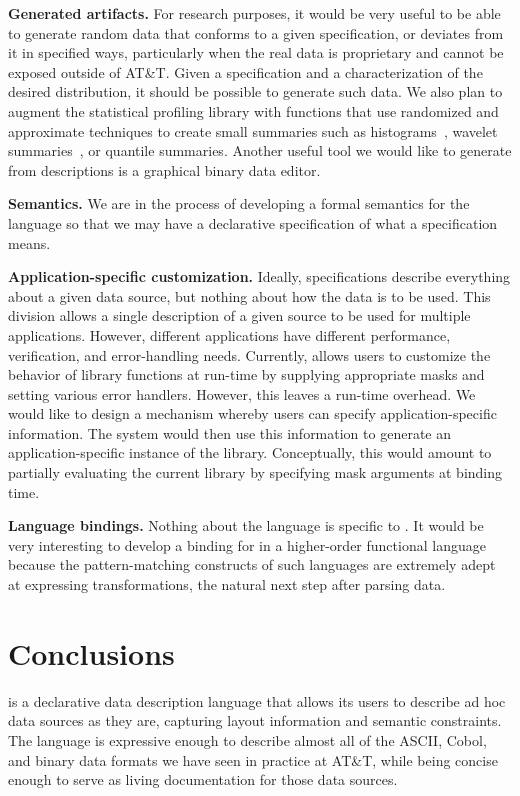 \documentclass{sig-alternate}
\begin{document}
\textbf{Generated artifacts.} 
For research purposes, it would be very useful to be able to generate random data that conforms to a given specification, or 
deviates from it in specified ways, particularly when the real data is proprietary and cannot be exposed outside of AT\&T. 
Given a \pads{} specification and a characterization of the desired distribution, it should be possible to generate such data.  We also plan to augment the statistical profiling library with
functions that use randomized and approximate techniques to create
small summaries such as histograms~\cite{histograms,histograms-wavelets}, wavelet summaries~\cite{histograms-wavelets},
or quantile summaries\cite{quantiles}.
Another useful tool we 
would like to generate from \pads{} descriptions is a graphical binary data editor. 

\textbf{Semantics.}  We are in the process of developing a formal semantics for the \pads{} language so that we may have a declarative specification of what a \pads{} specification means.

\textbf{Application-specific customization.}
Ideally, \pads{} specifications describe everything about a given
data source, but nothing about how the data is to be used. This
division allows a single description of a given source to be used
for multiple applications.  However, different applications have different
performance, verification, and error-handling needs.  Currently,
\pads{} allows users to customize the behavior of library
functions at run-time by supplying appropriate masks and setting various error handlers.  However, this leaves a run-time overhead.  We would like to 
design a mechanism whereby users can specify application-specific information.  The \pads{} system would then use this information to generate an 
application-specific instance of the library.  Conceptually, this would
amount to partially evaluating the current \pads{} library by specifying mask arguments at binding time.

\textbf{Language bindings.}  Nothing about the \pads{} language is specific to \C{}.  It would be very interesting to develop a binding for \pads{} in a higher-order functional language because the pattern-matching constructs of such languages are extremely adept at expressing transformations, the natural next step after parsing data.


\section{Conclusions}
\pads{} is a declarative data description language that allows 
its users to describe ad hoc data sources as they are, capturing
layout information and semantic constraints.  The language
is expressive enough to describe almost all of the ASCII, Cobol, 
and binary data formats we have seen in practice at AT\&T, while being 
concise enough to serve as living documentation for those data sources.  
\end{document}
